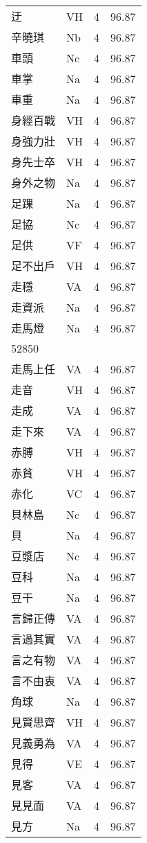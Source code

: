 \documentclass[twocolumn]{book}
\begin{document}
\begin{supertabular}{llrr}
迂 & VH & 4 &  96.87\\
辛曉琪 & Nb & 4 &  96.87\\
車頭 & Nc & 4 &  96.87\\
車掌 & Na & 4 &  96.87\\
車重 & Na & 4 &  96.87\\
身經百戰 & VH & 4 &  96.87\\
身強力壯 & VH & 4 &  96.87\\
身先士卒 & VH & 4 &  96.87\\
身外之物 & Na & 4 &  96.87\\
足踝 & Na & 4 &  96.87\\
足協 & Nc & 4 &  96.87\\
足供 & VF & 4 &  96.87\\
足不出戶 & VH & 4 &  96.87\\
走穩 & VA & 4 &  96.87\\
走資派 & Na & 4 &  96.87\\
走馬燈 & Na & 4 &  96.87\\
52850\\
走馬上任 & VA & 4 &  96.87\\
走音 & VH & 4 &  96.87\\
走成 & VA & 4 &  96.87\\
走下來 & VA & 4 &  96.87\\
赤膊 & VH & 4 &  96.87\\
赤貧 & VH & 4 &  96.87\\
赤化 & VC & 4 &  96.87\\
貝林島 & Nc & 4 &  96.87\\
貝 & Na & 4 &  96.87\\
豆漿店 & Nc & 4 &  96.87\\
豆科 & Na & 4 &  96.87\\
豆干 & Na & 4 &  96.87\\
言歸正傳 & VA & 4 &  96.87\\
言過其實 & VA & 4 &  96.87\\
言之有物 & VA & 4 &  96.87\\
言不由衷 & VA & 4 &  96.87\\
角球 & Na & 4 &  96.87\\
見賢思齊 & VH & 4 &  96.87\\
見義勇為 & VA & 4 &  96.87\\
見得 & VE & 4 &  96.87\\
見客 & VA & 4 &  96.87\\
見見面 & VA & 4 &  96.87\\
見方 & Na & 4 &  96.87\\

\end{supertabular}
\end{document}
